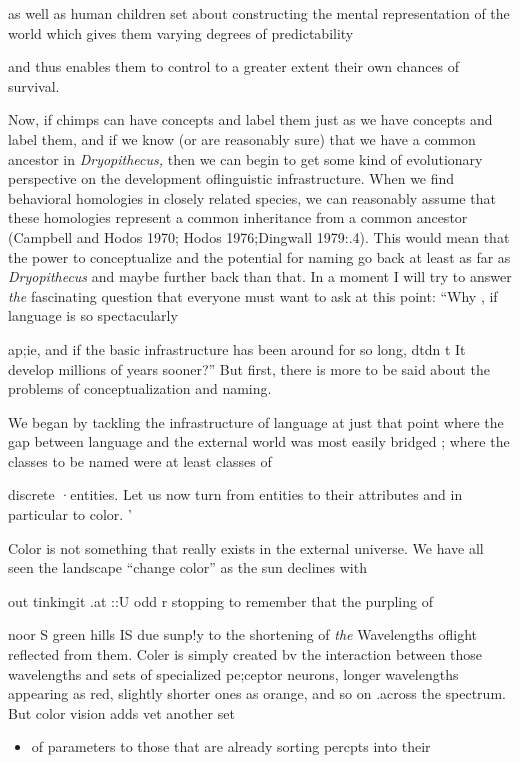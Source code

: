 
as well as human children set about constructing the mental representa\-tion of the world which gives them varying degrees of predictability

and thus enables them to control to a greater extent their own chances of survival.

Now, if chimps can have concepts and label them just as we have concepts and label them, and if we know (or are reasonably sure) that we have a common ancestor in \textit{Dryopithecus,} then we can begin to get some kind of evolutionary perspective on the development oflinguistic infrastructure. When we find behavioral homologies in closely related species, we can reasonably assume that these homologies represent a common inheritance from a common ancestor (Campbell and Hodos 1970; Hodos 1976;Dingwall 1979:.4). This would mean that the power to conceptualize and the potential for naming go back at least as far as \textit{Dryopithecus} and maybe further back than that. In a moment I will try to answer \textit{the} fascinating question that everyone must want to ask at this point: ``Why , if language is so spectacularly

ap;ie, and if the basic infrastructure has been around for so long, dtdn t It develop millions of years sooner?'' But first, there is more to be said about the problems of conceptualization and naming.

We began by tackling the infrastructure of language at just that point where the gap between language and the external world was most easily bridged ; where the classes to be named were at least classes of

discrete ·entities. Let us now turn from entities to their attributes and in particular to color. '

Color is not something that really exists in the external universe. We have all seen the landscape ``change color'' as the sun declines with{\textquotedbl}

out tinkingit .at ::U odd r stopping to remember that the purpling of

noor S green hills IS due sunp!y to the shortening of \textit{the} Wavelengths oflight reflected from them. Coler is simply created bv the interaction between those wavelengths and sets of specialized pe;ceptor neurons, longer wavelengths appearing as red, slightly shorter ones as orange, and so on .across the spectrum. But color vision adds vet another set

\begin{itemize}
\item of parameters to those that are already sorting percpts into their
\end{itemize}


